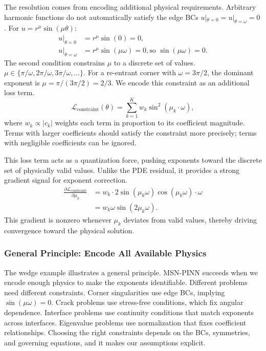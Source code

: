\documentclass{article}
\theoremstyle{plain}
\theoremstyle{definition}
\theoremstyle{remark}
\newcommand{\mcL}{\mathcal{L}}
\begin{document}
The resolution comes from encoding additional physical requirements. Arbitrary harmonic functions do not automatically satisfy the edge BCs $u|_{\theta=0} = u|_{\theta=\omega} = 0$. For $u = r^\mu \sin(\mu\theta)$:
\begin{align}
	u|_{\theta=0}      & = r^\mu \sin(0) = 0,                                         \\
	u|_{\theta=\omega} & = r^\mu \sin(\mu\omega) = 0, \text{so } \sin(\mu\omega) = 0.
\end{align}
The second condition constrains $\mu$ to a discrete set of values. $\mu \in \{\pi/\omega, 2\pi/\omega, 3\pi/\omega, \ldots\}$. For a re-entrant corner with $\omega = 3\pi/2$, the dominant exponent is $\mu = \pi/(3\pi/2) = 2/3$. We encode this constraint as an additional loss term.
\begin{equation}
	\label{eq:constraint_loss}
	\mcL_{\text{constraint}}(\theta) = \sum_{k=1}^{K} w_k \sin^2(\mu_k \cdot \omega),
\end{equation}
where $w_k \propto |c_k|$ weights each term in proportion to its coefficient magnitude. Terms with larger coefficients should satisfy the constraint more precisely; terms with negligible coefficients can be ignored.

This loss term acts as a quantization force, pushing exponents toward the discrete set of physically valid values. Unlike the PDE residual, it provides a strong gradient signal for exponent correction.
\begin{equation}
	\begin{aligned}
		\frac{\partial \mcL_{\text{constraint}}}{\partial \mu_k} & = w_k \cdot 2\sin(\mu_k\omega)\cos(\mu_k\omega) \cdot \omega \\
		                                                         & = w_k \omega \sin(2\mu_k\omega).
	\end{aligned}
\end{equation}
This gradient is nonzero whenever $\mu_k$ deviates from valid values, thereby driving convergence toward the physical solution.

\subsubsection{General Principle: Encode All Available Physics}

The wedge example illustrates a general principle. MSN-PINN succeeds when we encode enough physics to make the exponents identifiable. Different problems need different constraints. Corner singularities use edge BCs, implying $\sin(\mu\omega) = 0$. Crack problems use stress-free conditions, which fix angular dependence. Interface problems use continuity conditions that match exponents across interfaces. Eigenvalue problems use normalization that fixes coefficient relationships. Choosing the right constraints depends on the BCs, symmetries, and governing equations, and it makes our assumptions explicit.
\end{document}
